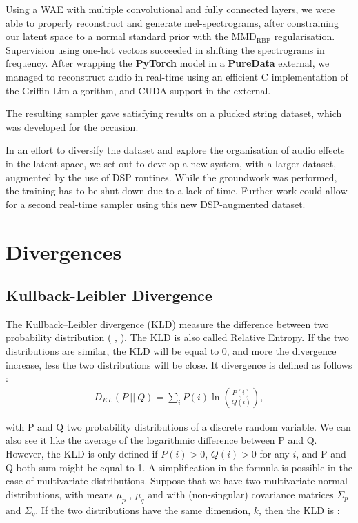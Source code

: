 \documentclass[11pt, english]{article}
\begin{document}
Using a WAE with multiple convolutional and fully connected layers, we were able to properly reconstruct and generate mel-spectrograms, after constraining our latent space to a normal standard prior with the $\text{MMD}_\text{RBF}$ regularisation. Supervision using one-hot vectors succeeded in shifting the spectrograms in frequency.
After wrapping the \textbf{PyTorch} model in a \textbf{PureData} external, we managed to reconstruct audio in real-time using an efficient C implementation of the Griffin-Lim algorithm, and CUDA support in the external.

The resulting sampler gave satisfying results on a plucked string dataset, which was developed for the occasion.

In an effort to diversify the dataset and explore the organisation of audio effects in the latent space, we set out to develop a new system, with a larger dataset, augmented by the use of DSP routines. While the groundwork was performed, the training has to be shut down due to a lack of time. Further work could allow for a second real-time sampler using this new DSP-augmented dataset.




\newpage
\appendix
\section{Divergences}
\label{sec:appendix}

\subsection{Kullback-Leibler Divergence} 


The Kullback–Leibler divergence (KLD) measure the difference between two probability distribution ( \cite{KL_1951}, \cite{K_1959} ). The KLD is also called Relative Entropy.
If the two distributions are similar, the KLD will be equal to 0, and more the divergence increase, less the two distributions will be close. It divergence is defined as follows : 
\begin{align}
D_{KL}(P \: || \: Q) = \sum_i P(i) \ln \left( \frac{P(i)}{Q(i)} \right) ,
\end{align}

with P and Q two probability distributions of a discrete random variable.
We can also see it like the average of the logarithmic difference between P and Q. However, the KLD is only defined if $P(i) > 0$, $Q(i) > 0 $ for any $i$, and P and Q both sum might be equal to 1. 
A simplification in the formula is possible in the case of multivariate distributions. 
Suppose that we have two multivariate normal distributions, with means 
$\mu_p$ , $\mu_q$ and with (non-singular) covariance matrices $\Sigma_p$ and $\Sigma_q$. 
 If the two distributions have the same dimension, 
$k$, then the KLD is : 
\end{document}

